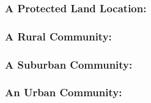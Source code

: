\subsubsection{A Protected Land Location: }

\subsubsection{A Rural Community: }

\subsubsection{A Suburban Community: }

\subsubsection{An Urban Community: }

